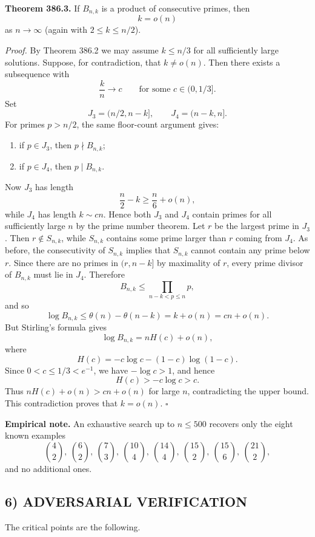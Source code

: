 \medskip

\textbf{Theorem 386.3.} If $B_{n,k}$ is a product of consecutive primes, then
\[
k=o(n)
\]
as $n\to\infty$ (again with $2\leq k\leq n/2$).

\emph{Proof.} By Theorem 386.2 we may assume $k\leq n/3$ for all sufficiently large solutions.
Suppose, for contradiction, that $k\neq o(n)$. Then there exists a subsequence with
\[
\frac{k}{n}\to c
\qquad\text{for some } c\in(0,1/3].
\]
Set
\[
J_3=(n/2,n-k],\qquad J_4=(n-k,n].
\]
For primes $p>n/2$, the same floor-count argument gives:

\begin{enumerate}
\item if $p\in J_3$, then $p\nmid B_{n,k}$;
\item if $p\in J_4$, then $p\mid B_{n,k}$.
\end{enumerate}

Now $J_3$ has length
\[
\frac n2-k\geq \frac n6+o(n),
\]
while $J_4$ has length $k\sim cn$. Hence both $J_3$ and $J_4$ contain primes for all sufficiently large $n$ by the prime number theorem.
Let $r$ be the largest prime in $J_3$. Then $r\notin S_{n,k}$, while $S_{n,k}$ contains some prime larger than $r$ coming from $J_4$. As before, the consecutivity of $S_{n,k}$ implies that $S_{n,k}$ cannot contain any prime below $r$. Since there are no primes in $(r,n-k]$ by maximality of $r$, every prime divisor of $B_{n,k}$ must lie in $J_4$.
Therefore
\[
B_{n,k}\leq \prod_{n-k<p\leq n} p,
\]
and so
\[
\log B_{n,k}\leq \theta(n)-\theta(n-k)=k+o(n)=cn+o(n).
\]
But Stirling's formula gives
\[
\log B_{n,k}=nH(c)+o(n),
\]
where
\[
H(c)=-c\log c-(1-c)\log(1-c).
\]
Since $0<c\leq 1/3<e^{-1}$, we have $-\log c>1$, and hence
\[
H(c)>-c\log c>c.
\]
Thus $nH(c)+o(n)>cn+o(n)$ for large $n$, contradicting the upper bound.
This contradiction proves that $k=o(n)$. \hfill $\square$

\medskip

\textbf{Empirical note.} An exhaustive search up to $n\leq 500$ recovers only the eight known examples
\[
\binom{4}{2},\ \binom{6}{2},\ \binom{7}{3},\ \binom{10}{4},\ \binom{14}{4},\ \binom{15}{2},\ \binom{15}{6},\ \binom{21}{2},
\]
and no additional ones.

\subsection*{6) ADVERSARIAL VERIFICATION}
The critical points are the following.

